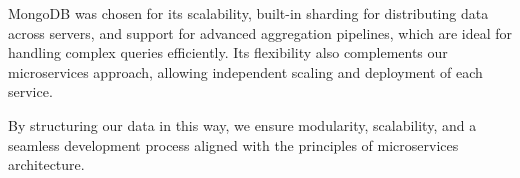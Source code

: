 MongoDB was chosen for its scalability, built-in sharding for distributing data across servers, and support for advanced aggregation pipelines, which are ideal for handling complex queries efficiently. Its flexibility also complements our microservices approach, allowing independent scaling and deployment of each service.

By structuring our data in this way, we ensure modularity, scalability, and a seamless development process aligned with the principles of microservices architecture.
